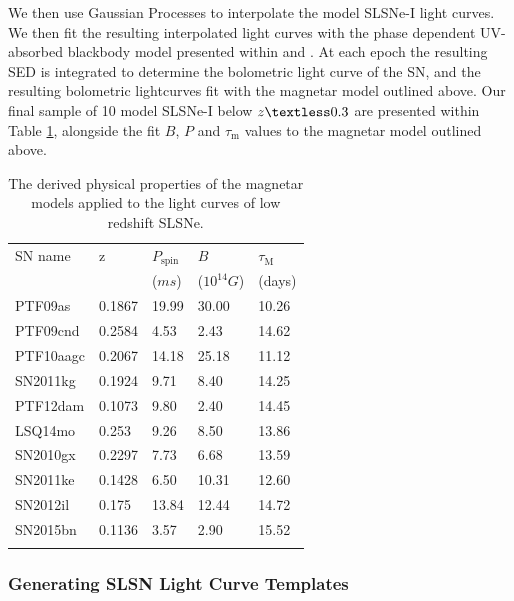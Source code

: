 \documentclass[a4paper,fleqn,usenatbib]{mnras}
\begin{document}
We then use Gaussian Processes to interpolate the model SLSNe-I light curves. We then fit the resulting interpolated light curves with the phase dependent UV-absorbed blackbody model presented within \cite{Inserra2017Euclid} and \cite{Angus2018}. At each epoch the resulting SED is integrated to determine the bolometric light curve of the SN, and the resulting bolometric lightcurves fit with the magnetar model outlined above. Our final sample of 10 model SLSNe-I below $z\textless0.3$ are presented within Table \ref{tab:slsnproperties}, alongside the fit $B$, $P$ and $\tau_{\mathrm{m}}$ values to the magnetar model outlined above. 

\begin{table}
	\caption{The derived physical properties of the magnetar models applied to the light curves of low redshift SLSNe.}
	\centering
	\begin{tabular}{l l l l l} 
		\hline
		SN name 	&  z  	&  $P_{\mathrm{spin}}$	 &$B$& $\tau_{\mathrm{M}}$	 \\
		  		&       & ($ms$) 				& ($10^{14}G$)& (days)			 \\
		\hline
        PTF09as     &0.1867 &     19.99 &	30.00 &	10.26 \\
        PTF09cnd    &0.2584&     4.53  &  2.43 &14.62 \\
        PTF10aagc   & 0.2067&     14.18 &	25.18 &11.12 \\ 
        SN2011kg    &0.1924&     9.71  &  8.40 &14.25 \\
        PTF12dam    &0.1073&     9.80 &	2.40 &	14.45 \\
        LSQ14mo     &0.253&     9.26  &  8.50 &	13.86 \\
        SN2010gx    &0.2297&     7.73  &  6.68 & 13.59  \\
        SN2011ke    &0.1428&     6.50 &	10.31 &	12.60 \\
        SN2012il    &0.175&     13.84 &  12.44 & 14.72 \\
        SN2015bn    &0.1136 &     3.57  &  2.90 & 15.52 \\ 
		\hline
		\label{tab:slsnproperties}
	\end{tabular}
 \end{table}



\subsubsection{Generating SLSN Light Curve Templates}
\end{document}
